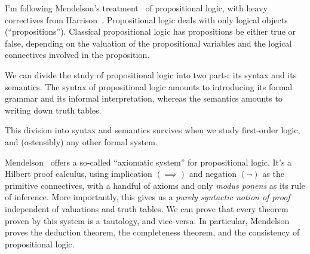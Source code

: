 \begin{node}\label{prop-0000}%
I'm following Mendelson's treatment~\cite{mendelson2015mathematical} of
propositional logic, with heavy correctives from
Harrison~\cite{harrison2009handbook}. Propositional logic deals with
only logical objects (``propositions''). Classical propositional logic
has propositions be either true or false, depending on the valuation of
the propositional variables and the logical connectives involved in the
proposition.
\end{node}

\begin{node}\label{prop-000H}%
We can divide the study of propositional logic into two parts: its
syntax and its semantics. The syntax of propositional logic amounts to
introducing its formal grammar and its informal interpretation, whereas
the semantics amounts to writing down truth tables.

This division into syntax and semantics survives when we study
first-order logic, and (ostensibly) any other formal system.
\end{node}


\begin{node}\label{prop-000F}%
Mendelson~\cite[\S1.4]{mendelson2015mathematical} offers a so-called
``axiomatic system'' for propositional logic. It's a Hilbert proof
calculus, using implication $(\implies)$ and negation $(\neg)$ as the
primitive connectives, with a handful of axioms and only
\textit{modus ponens} as its rule of inference. More importantly, this
gives us a \emph{purely syntactic notion of proof} independent of
valuations and truth tables. We can prove that every theorem proven
by this system is a tautology, and vice-versa. In particular, Mendelson
proves the deduction theorem, the completeness theorem, and the consistency of
propositional logic.
\end{node}


